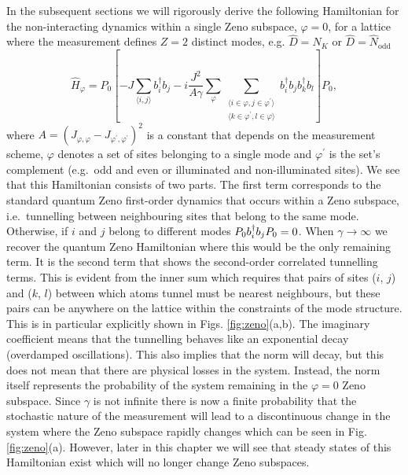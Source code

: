 In the subsequent sections we will rigorously derive the following
Hamiltonian for the non-interacting dynamics within a single Zeno
subspace, $\varphi = 0$, for a lattice where the measurement defines
$Z = 2$ distinct modes, e.g. $\hat{D} = \hat{N}_K$ or
$\hat{D} = \hat{N}_\mathrm{odd}$
\begin{equation}
  \label{eq:hz}
  \hat{H}_\varphi = P_0 \left[ -J \sum_{\langle i, j \rangle}
    b^\dagger_i b_j - i \frac{J^2} {A \gamma} \sum_{\varphi} 
    \sum_{\substack{\langle i \in \varphi, j \in \varphi^\prime
        \rangle \\ \langle k \in \varphi^\prime, l \in \varphi
        \rangle}} b^\dagger_i b_j b^\dagger_k b_l \right] P_0,
\end{equation}
where
$A = (J_{\varphi,\varphi} - J_{\varphi^\prime,\varphi^\prime})^2$ is a
constant that depends on the measurement scheme, $\varphi$ denotes a
set of sites belonging to a single mode and $\varphi^\prime$ is the
set's complement (e.g.~odd and even or illuminated and non-illuminated
sites). We see that this Hamiltonian consists of two parts. The first
term corresponds to the standard quantum Zeno first-order dynamics
that occurs within a Zeno subspace, i.e.~tunnelling between
neighbouring sites that belong to the same mode. Otherwise, if $i$ and
$j$ belong to different modes $P_0 b^\dagger_i b_j P_0 = 0$. When
$\gamma \rightarrow \infty$ we recover the quantum Zeno Hamiltonian
where this would be the only remaining term. It is the second term
that shows the second-order correlated tunnelling terms. This is
evident from the inner sum which requires that pairs of sites ($i$,
$j$) and ($k$, $l$) between which atoms tunnel must be nearest
neighbours, but these pairs can be anywhere on the lattice within the
constraints of the mode structure. This is in particular explicitly
shown in Figs. \ref{fig:zeno}(a,b). The imaginary coefficient means
that the tunnelling behaves like an exponential decay (overdamped
oscillations). This also implies that the norm will decay, but this
does not mean that there are physical losses in the system. Instead,
the norm itself represents the probability of the system remaining in
the $\varphi = 0$ Zeno subspace. Since $\gamma$ is not infinite there
is now a finite probability that the stochastic nature of the
measurement will lead to a discontinuous change in the system where the
Zeno subspace rapidly changes which can be seen in
Fig. \ref{fig:zeno}(a). However, later in this chapter we will see
that steady states of this Hamiltonian exist which will no longer
change Zeno subspaces.

